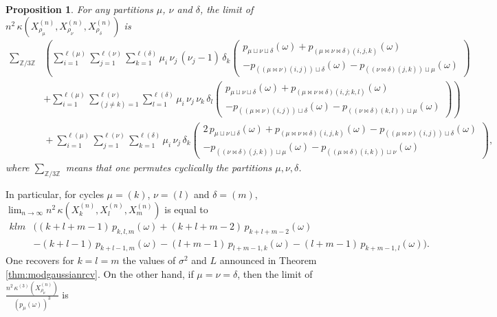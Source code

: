 \documentclass[12pt,a4paper,reqno]{amsart}
\newtheorem{proposition}[lemma]{Proposition}
\theoremstyle{remark}
\newcommand{\Z}{\mathbb{Z}}
\newcommand{\SubGraph}{X^{(n)}}
\begin{document}
\begin{proposition}
For any partitions $\mu$, $\nu$ and $\delta$, the limit of $n^{2}\,\kappa(\SubGraph_{\rho_\mu},\SubGraph_{\rho_\nu},\SubGraph_{\rho_\delta})$ is 
\begin{align*}\sum_{\Z/3\Z}&\left(\sum_{i=1}^{\ell(\mu)}\sum_{j=1}^{\ell(\nu)}\sum_{k =1}^{\ell(\delta)} \mu_{i}\,\nu_{j}\,(\nu_{j}-1)\,\delta_{k}\left(\substack{p_{\mu\sqcup \nu\sqcup \delta}(\omega)+p_{(\mu\Join \nu\Join \delta)(i,j,k)}(\omega)\\-p_{((\mu\Join \nu)(i,j)) \sqcup \delta}(\omega)-p_{((\nu\Join \delta)(j,k)) \sqcup \mu}(\omega)}\right)\right.\\
&\left.+\sum_{i=1}^{\ell(\mu)}\sum_{(j\neq k) =1}^{\ell(\nu)} \sum_{l=1}^{\ell(\delta)}\mu_{i}\,\nu_{j}\,\nu_{k}\,\delta_{l}\left(\substack{ p_{\mu\sqcup \nu\sqcup \delta}(\omega)+p_{(\mu\Join \nu\Join \delta)(i,j;k,l)}(\omega)\\-p_{((\mu\Join \nu)(i,j)) \sqcup \delta}(\omega)-p_{((\nu\Join \delta)(k,l)) \sqcup \mu}(\omega)}\right) \right)\\
&\!\!\!\!\!\!\!\!\!\!\!\!+ \sum_{i=1}^{\ell(\mu)}\sum_{j=1}^{\ell(\nu)}\sum_{k =1}^{\ell(\delta)} \mu_{i}\,\nu_{j}\,\delta_{k}\left(\substack{2\,p_{\mu\sqcup \nu\sqcup \delta}(\omega)+p_{(\mu\Join \nu\Join \delta)(i,j,k)}(\omega)-p_{((\mu\Join \nu)(i,j)) \sqcup \delta}(\omega)\\
-p_{((\nu\Join \delta)(j,k)) \sqcup \mu}(\omega)-p_{((\mu\Join \delta)(i,k))\sqcup \nu }(\omega)}\right),\end{align*}
where $\sum_{\Z/3\Z}$ means that one permutes cyclically the partitions $\mu,\nu,\delta$.
\end{proposition}
\noindent In particular, for cycles $\mu=(k)$, $\nu=(l)$ and $\delta=(m)$, $\lim_{n \to \infty} n^{2}\,\kappa(\SubGraph_{k},\SubGraph_{l},\SubGraph_{m})$ is equal to
\begin{align*}
klm&\big((k+l+m-1)\,p_{k,l,m}(\omega)+(k+l+m-2)\,p_{k+l+m-2}(\omega)\\
&-(k+l-1)\,p_{k+l-1,m}(\omega)-(l+m-1)\,p_{l+m-1,k}(\omega)-(l+m-1)\,p_{k+m-1,l}(\omega)\big).
\end{align*}
One recovers for $k=l=m$ the values of $\sigma^{2}$ and $L$ announced in Theorem \ref{thm:modgaussianrcv}. On the other hand, if $\mu=\nu=\delta$, then the limit of $\frac{n^{2}\,\kappa^{(3)}(X_{\rho_{\mu}}^{(n)})}{(p_{\mu}(\omega))^{3}}$ is 
\end{document}

